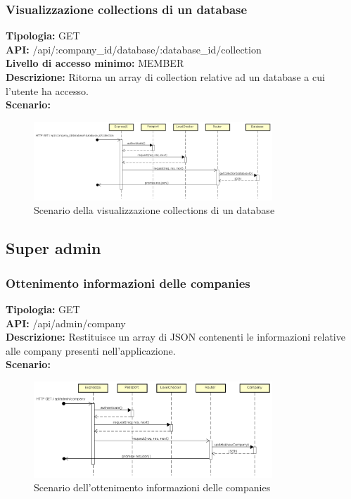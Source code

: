 \newpage
\subsubsection{Visualizzazione collections di un database}
\textbf{Tipologia:} GET \\
\textbf{API:} /api/:company\_id/database/:database\_id/collection \\
\textbf{Livello di accesso minimo:} MEMBER \\
\textbf{Descrizione:} Ritorna un array di collection relative ad un database a cui l'utente ha accesso. \\
\textbf{Scenario:} 
\begin{figure}[h]
\centering
\includegraphics[width=0.8\textwidth]{res/sections/backend/(GET)collection.png}
\caption{Scenario della visualizzazione collections di un database}
\end{figure}

\newpage
\subsection{Super admin}
\subsubsection{Ottenimento informazioni delle companies}
\textbf{Tipologia:} GET \\
\textbf{API:} /api/admin/company \\
\textbf{Descrizione:} Restituisce un array di JSON contenenti le informazioni relative alle company presenti nell'applicazione. \\
\textbf{Scenario:} 
\begin{figure}[h]
\centering
\includegraphics[width=0.8\textwidth]{res/sections/backend/(GET)companySA.png}
\caption{Scenario dell'ottenimento informazioni delle companies}
\end{figure}

